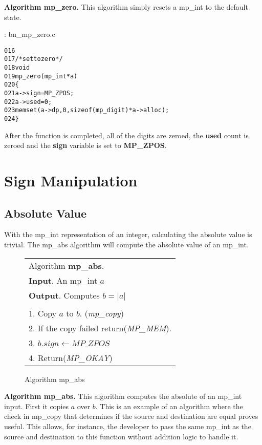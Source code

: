 \documentclass[b5paper]{book}
\begin{document}
\textbf{Algorithm mp\_zero.}
This algorithm simply resets a mp\_int to the default state.  

\vspace{+3mm}\begin{small}
\hspace{-5.1mm}{\bf File}: bn\_mp\_zero.c
\vspace{-3mm}
\begin{alltt}
016   
017   /* set to zero */
018   void
019   mp_zero (mp_int * a)
020   \{
021     a->sign = MP_ZPOS;
022     a->used = 0;
023     memset (a->dp, 0, sizeof (mp_digit) * a->alloc);
024   \}
\end{alltt}
\end{small}

After the function is completed, all of the digits are zeroed, the \textbf{used} count is zeroed and the 
\textbf{sign} variable is set to \textbf{MP\_ZPOS}.

\section{Sign Manipulation}
\subsection{Absolute Value}
With the mp\_int representation of an integer, calculating the absolute value is trivial.  The mp\_abs algorithm will compute
the absolute value of an mp\_int.

\newpage\begin{figure}[here]
\begin{center}
\begin{tabular}{l}
\hline Algorithm \textbf{mp\_abs}. \\
\textbf{Input}.   An mp\_int $a$ \\
\textbf{Output}.  Computes $b = \vert a \vert$ \\
\hline \\
1.  Copy $a$ to $b$.  (\textit{mp\_copy}) \\
2.  If the copy failed return(\textit{MP\_MEM}). \\
3.  $b.sign \leftarrow MP\_ZPOS$ \\
4.  Return(\textit{MP\_OKAY}) \\
\hline
\end{tabular}
\end{center}
\caption{Algorithm mp\_abs}
\end{figure}

\textbf{Algorithm mp\_abs.}
This algorithm computes the absolute of an mp\_int input.  First it copies $a$ over $b$.  This is an example of an
algorithm where the check in mp\_copy that determines if the source and destination are equal proves useful.  This allows,
for instance, the developer to pass the same mp\_int as the source and destination to this function without addition 
logic to handle it.
\end{document}
